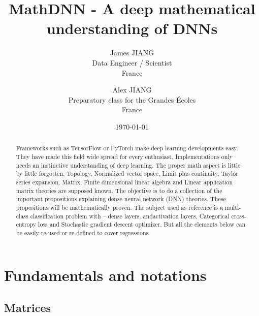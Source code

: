 \documentclass[11pt,en]{elegantpaper}
\title{MathDNN - A deep mathematical understanding of DNNs}
\author{James JIANG \\ Data Engineer / Scientist \\ France \and Alex JIANG \\ Preparatory class for the Grandes Écoles \\ France}
\institute{\href{https://github.com/iLoveDataJjia}{iLoveDataJjia Github}}
\date{\today}
\begin{document}
\maketitle

\begin{abstract}
  Frameworks such as TensorFlow or PyTorch make deep learning developments easy.
  They have made this field wide spread for every enthusiast.
  Implementations only needs an instinctive understanding of deep learning.
  The proper math aspect is little by little forgotten.
  Topology, Normalized vector space, Limit plus continuity, Taylor series expansion, Matrix,
  Finite dimensional linear algebra and Linear application matrix theories are supposed known.
  The objective is to do a collection of the important propositions explaining dense neural
  network (DNN) theories. These propositions will be mathematically proven.
  The subject used as reference is a multi-class classification problem with
  – dense layers, andactivation layers, Categorical cross-entropy loss and Stochastic
  gradient descent optimizer. But all the elements below can be easily re-used or re-defined
  to cover regressions.
\end{abstract}

\section{Fundamentals and notations}

\subsection{Matrices}
\end{document}
